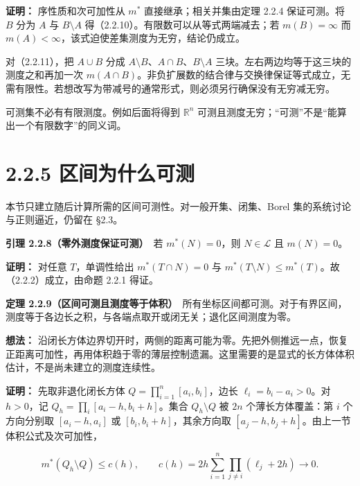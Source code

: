 \documentclass[11pt,a4paper]{article}
\begin{document}
\textbf{证明：} 序性质和次可加性从 \(m^*\) 直接继承；相关并集由定理
2.2.4 保证可测。将 \(B\) 分为 \(A\) 与 \(B\setminus A\)
得（2.2.10）。有限数可以从等式两端减去；若 \(m(B)=\infty\) 而
\(m(A)<\infty\)，该式迫使差集测度为无穷，结论仍成立。

对（2.2.11），把 \(A\cup B\) 分成
\(A\setminus B\)、\(A\cap B\)、\(B\setminus A\)
三块。左右两边均等于这三块的测度之和再加一次
\(m(A\cap B)\)。非负扩展数的结合律与交换律保证等式成立，无需有限性。若想改写为带减号的通常形式，则必须另行确保没有无穷减无穷。

可测集不必有有限测度。例如后面将得到 \(\mathbb R^n\)
可测且测度无穷；``可测''不是``能算出一个有限数字''的同义词。

\section[\S{}2.2.5
区间为什么可测]{2.2.5
区间为什么可测}\label{ux533aux95f4ux4e3aux4ec0ux4e48ux53efux6d4b}

本节只建立随后计算所需的区间可测性。对一般开集、闭集、Borel
集的系统讨论与正则逼近，仍留在 §2.3。

\textbf{引理 2.2.8（零外测度保证可测）}　若 \(m^*(N)=0\)，则
\(N\in\mathcal L\) 且 \(m(N)=0\)。

\textbf{证明：} 对任意 \(T\)，单调性给出 \(m^*(T\cap N)=0\) 与
\(m^*(T\setminus N)\le m^*(T)\)。故（2.2.2）成立，由命题 2.2.1 得证。

\textbf{定理
2.2.9（区间可测且测度等于体积）}　所有坐标区间都可测。对于有界区间，测度等于各边长之积，与各端点取开或闭无关；退化区间测度为零。

\textbf{想法：}
沿闭长方体边界切开时，两侧的距离可能为零。先把外侧推远一点，恢复正距离可加性，再用体积趋于零的薄层控制遗漏。这里需要的是显式的长方体体积估计，不是尚未建立的测度连续性。

\textbf{证明：} 先取非退化闭长方体 \(Q=\prod_{i=1}^n[a_i,b_i]\)，边长
\(\ell_i=b_i-a_i>0\)。对 \(h>0\)，记 \(Q_h=\prod_i[a_i-h,b_i+h]\)。集合
\(Q_h\setminus Q\) 被 \(2n\) 个薄长方体覆盖：第 \(i\) 个方向分别取
\([a_i-h,a_i]\) 或 \([b_i,b_i+h]\)，其余方向取
\([a_j-h,b_j+h]\)。由上一节体积公式及次可加性，

\begin{equation*}
m^*(Q_h\setminus Q)\le c(h),\qquad
c(h)=2h\sum_{i=1}^n\prod_{j\ne i}(\ell_j+2h)\longrightarrow0.
\tag{2.2.12}
\end{equation*}
\end{document}
